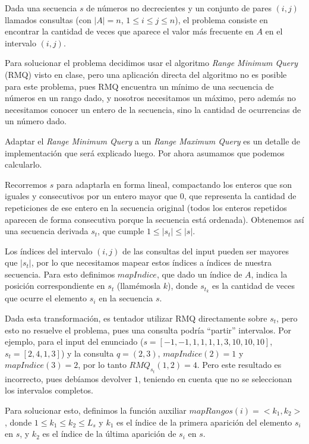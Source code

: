 Dada una secuencia $s$ de números no decrecientes y un conjunto de pares
$(i,j)$ llamados consultas (con $|A|=n$, $1 \le i \le j \le n$), el problema
consiste en encontrar la cantidad de veces que aparece el valor más frecuente
en $A$ en el intervalo $(i,j)$.

Para solucionar el problema decidimos usar el algoritmo {\sl Range Minimum
Query} (RMQ) visto en clase, pero una aplicación directa del algoritmo no es
posible para este problema, pues RMQ encuentra un mínimo de una secuencia
de números en un rango dado, y nosotros necesitamos un máximo, pero
además no necesitamos conocer un entero de la secuencia, sino la cantidad
de ocurrencias de un número dado.

Adaptar el {\sl Range Minimum Query} a un {\sl Range Maximum Query} es un
detalle de implementación que será explicado luego. Por ahora asumamos
que podemos calcularlo.

Recorremos $s$ para adaptarla en forma lineal, compactando los enteros que
son iguales y consecutivos por un entero mayor que $0$, que representa la
cantidad de repeticiones de ese entero en la secuencia original (todos los
enteros repetidos aparecen de forma consecutiva porque la secuencia está
ordenada). Obtenemos así una secuencia derivada $s_t$, que cumple
$1 \le |s_t| \le |s|$.

Los índices del intervalo $(i,j)$ de las consultas del input pueden ser
mayores que $|s_t|$, por lo que necesitamos mapear estos índices a índices de
nuestra secuencia. Para esto definimos $mapIndice$, que dado un índice de $A$,
indica la posición correspondiente en $s_t$ (llamémosla $k$), donde $s_{t_k}$
es la cantidad de veces que ocurre el elemento $s_i$ en la secuencia $s$.

Dada esta transformación, es tentador utilizar RMQ directamente sobre $s_t$, pero
esto no resuelve el problema, pues una consulta podría ``partir'' intervalos.
Por ejemplo, para el input del enunciado
($s = [-1, -1, 1, 1, 1, 1, 3, 10, 10, 10]$, $s_t = [2, 4, 1, 3]$) y la consulta
$q=(2,3)$, $mapIndice(2) = 1$ y $mapIndice(3) = 2$, por lo tanto $RMQ_{s_t}(1,2)
=4$. Pero este resultado es incorrecto, pues debíamos devolver $1$, teniendo en
cuenta que no se seleccionan los intervalos completos.

Para solucionar esto, definimos la función auxiliar $mapRangos(i) = <k_1,k_2>$,
donde $1 \le k_1 \le k_2 \le L_s$ y $k_1$ es el índice de la primera aparición
del elemento $s_i$ en $s$, y $k_2$ es el índice de la última aparición de $s_i$ en $s$.

